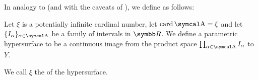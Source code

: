 \begin{definition}\label{def:parametric_hypersurface}
  In analogy to  (and with the caveats of ), we define  as follows:

  Let \( \xi \) is a potentially infinite cardinal number, let \( \Card \CA = \xi \) and let \( \{ I_\alpha \}_{\alpha \in \CA} \) be a family of intervals in \( \BR \). We define a parametric hypersurface to be a continuous image from the product space \( \prod_{\alpha \in \CA} I_\alpha \) to \( Y \).

  We call \( \xi \) the  of the hypersurface.
\end{definition}
